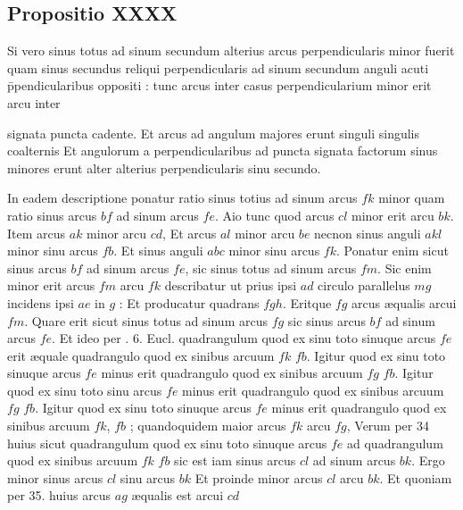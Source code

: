 \documentclass[11pt,a4paper]{article}
\begin{document}
\subsection*{Propositio XXXX}

Si vero sinus totus ad sinum secundum alterius arcus perpendicularis minor fuerit quam sinus secundus reliqui perpendicularis ad sinum secundum anguli acuti p̄pendicularibus oppositi : tunc arcus inter casus perpendicularium minor erit arcu inter

signata puncta cadente. Et arcus ad angulum majores erunt singuli singulis coalternis Et angulorum a perpendicularibus ad puncta signata factorum sinus minores erunt alter alterius perpendicularis sinu secundo.

In eadem descriptione ponatur ratio sinus totius ad sinum arcus $fk$ minor quam ratio sinus arcus $bf$ ad sinum arcus $fe$. Aio tunc quod arcus $cl$ minor erit arcu $bk$. Item arcus $ak$ minor arcu $cd$, Et arcus $al$ minor arcu $be$ necnon sinus anguli $akl$ minor sinu arcus $fb$. Et sinus anguli $abc$ minor sinu arcus $fk$. Ponatur enim sicut sinus arcus $bf$ ad sinum arcus $fe$, sic sinus totus ad sinum arcus $fm$. Sic enim minor erit arcus $fm$ arcu $fk$ describatur ut prius ipsi $ad$ circulo parallelus $mg$ incidens ipsi $ae$ in $g$ : Et producatur quadrans $fgh$. Eritque $fg$ arcus æqualis arcui $fm$. Quare erit sicut sinus totus ad sinum arcus $fg$ sic sinus arcus $bf$ ad sinum arcus $fe$. Et ideo per . 6. Eucl. quadrangulum quod ex sinu toto sinuque arcus $fe$ erit æquale quadrangulo quod ex sinibus arcuum $fk$ $fb$. Igitur quod ex sinu toto sinuque arcus $fe$ minus erit quadrangulo quod ex sinibus arcuum $fg$ $fb$. Igitur quod ex sinu toto sinu arcus $fe$ minus erit quadrangulo quod ex sinibus arcuum $fg$ $fb$. Igitur quod ex sinu toto sinuque arcus $fe$ minus erit quadrangulo quod ex sinibus arcuum $fk$, $fb$ ; quandoquidem maior arcus $fk$ arcu $fg$, Verum per 34 huius sicut quadrangulum quod ex sinu toto sinuque arcus $fe$ ad quadrangulum quod ex sinibus arcuum $fk$ $fb$ sic est iam sinus arcus $cl$ ad sinum arcus $bk$. Ergo minor sinus arcus $cl$ sinu arcus $bk$ Et proinde minor arcus $cl$ arcu $bk$. Et quoniam per 35. huius arcus $ag$ æqualis est arcui $cd$
\end{document}

